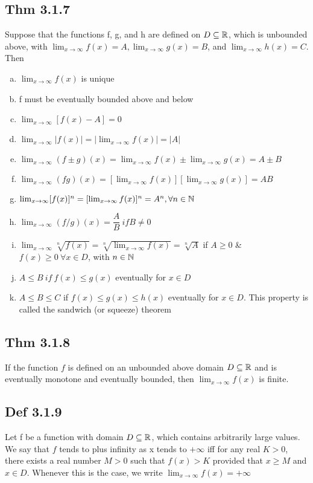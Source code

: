 \subsection*{Thm 3.1.7}
    Suppose that the functions f, g, and h are defined on $D \subseteq \mathbb{R}$, which is unbounded above, with $\lim_{x \to \infty} f (x) = A, \lim_{x \to \infty} g (x) = B$, and $\lim_{x \to \infty}  h (x) = C$. Then
    \begin{enumerate}[(a)]
        \item $\lim_{x \to \infty} f(x)$ is unique
        \item f must be eventually bounded above and below
        \item $\lim_{x \to \infty} [f(x) - A] = 0$
        \item $\lim_{x \to \infty} |f(x)| = | \lim_{x \to \infty} f(x)| = |A|$
        \item $\lim_{x \to \infty} ( f \pm g )(x) = \lim_{x \to \infty} f(x) \pm \lim_{x \to \infty} g(x) = A \pm B$
        \item $\lim_{x \to \infty} ( f g )(x) = [ \lim_{x \to \infty} f(x) ] [ \lim_{x \to \infty} g(x) ]= A B$
        \item $\lim_{x \to \infty} [f(x)]^{n} = [\lim_{x \to \infty} f(x)]^{n} = A^{n}, \forall n \in \mathbb{N}$
	\item $\lim_{x \to \infty} \left( f/g \right) (x) = \dfrac{A}{B} \ if B \not= 0$
	\item $\lim_{x \to \infty} \sqrt[n]{f(x)} = \sqrt[n]{\lim_{x \to \infty} f(x)} = \sqrt[n]{A}$ if $A \ge 0$ \& $f(x) \ge 0 \ \forall x \in D$, with $n \in \mathbb{N}$
	\item $A \le B \ if \ f(x) \le g(x)$ eventually for $x \in D$
	\item $A \le B \le C$ if $f (x) \le g (x) \le h (x)$ eventually for $x \in D$. This property is called the sandwich (or squeeze) theorem
 \end{enumerate}

\subsection*{Thm 3.1.8}
    If the function $f$ is defined on an unbounded above domain $D \subseteq \mathbb{R}$ and is eventually monotone and eventually bounded, then $\lim_{x \to \infty} f (x)$ is finite.

\subsection*{Def 3.1.9}
    Let f be a function with domain $D \subseteq \mathbb{R}$, which contains arbitrarily large values. We say that $f$ tends to plus infinity as x tends to $+ \infty$ iff for any real $K > 0$, there exists a real number $M > 0$ such that $f (x) > K$ provided that $x \ge M$ and $x \in  D$. Whenever this is the case, we write $\lim_{x \to \infty} f (x) = +\infty$

